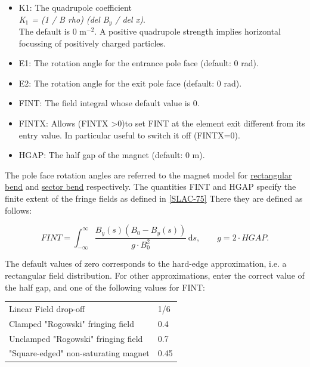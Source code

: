 \begin{itemize}
   \item K1: The quadrupole coefficient \\
     \textit{K$_1$ = (1 / B rho) (del B$_y$ / del x)}. \\
     The default is 0 m$^{-2}$. A positive quadrupole strength implies
     horizontal focussing of positively charged particles. 

   \item E1: The rotation angle for the entrance pole face (default: 0 rad). 
   \item E2: The rotation angle for the exit pole face (default: 0 rad). 
   \item FINT: The field integral whose default value is 0. 
   \item FINTX: Allows (FINTX \textgreater 0)to set FINT at the element
     exit different from its entry value. In particular useful to switch
     it off (FINTX=0). 

   \item HGAP: The half gap of the magnet (default: 0 m). 
\end{itemize} 

The pole face rotation angles are referred to the magnet model for
\href{local_system.html#rbend}{rectangular bend} and
\href{local_system.html#sbend}{sector bend} respectively. The quantities
FINT and HGAP specify the finite extent of the fringe fields as defined
in \href{bibliography.html#slac75}{[SLAC-75]} There they are defined as
follows:  


\[
FINT=\int_{-\infty}^\infty \frac{B_y(s)(B_0-B_y(s))}{g \cdot
  B_0^2}\,\mathrm{d}s ,\quad\quad g=2\cdot HGAP. 
\]

The default values of zero corresponds to the hard-edge approximation,
i.e. a rectangular field distribution. For other approximations, enter
the correct value of the half gap, and one of the following values for
FINT: 
 
\begin{center}
  \begin{tabular}{l l}
    Linear Field drop-off                   &  1/6 \\
    Clamped "Rogowski" fringing field       &  0.4 \\
    Unclamped "Rogowski" fringing field     &  0.7 \\
    "Square-edged" non-saturating magnet    &  0.45
  \end{tabular}
\end{center}



